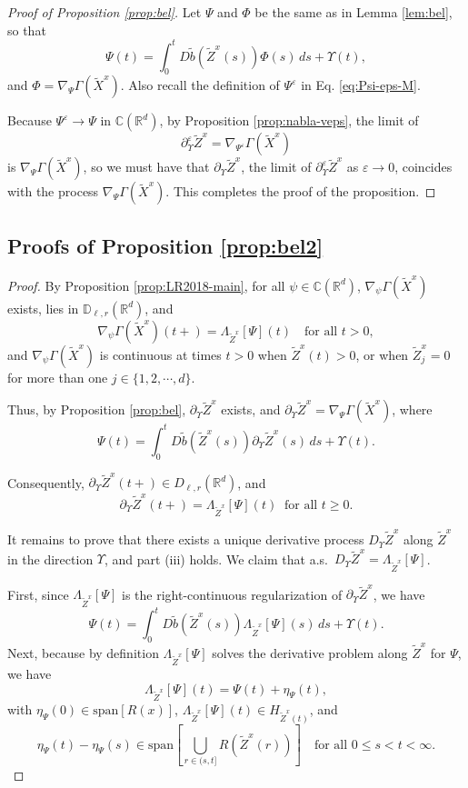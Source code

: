 \documentclass[11pt]{article}
\theoremstyle{definition}
\theoremstyle{plain}
\newcommand{\R}{\mathbb{R}}
\newcommand{\C}{\mathbb{C}}
\newcommand{\D}{\mathbb{D}}
\newcommand{\tb}{\tilde{b}}
\newcommand{\veps}{\varepsilon}
\begin{document}
\begin{appendices}
\begin{proof}[Proof of Proposition \ref{prop:bel}]
Let \( \Psi \) and \( \Phi \) be the same as in Lemma \ref{lem:bel}, so that
\[
\Psi(t) = \int_0^t D\tb(\tilde{Z}^x(s)) \Phi(s)\,ds + \Upsilon(t),
\]
and \( \Phi = \nabla_{\Psi} \Gamma(\tilde{X}^x) \). Also recall the definition of \( \Psi^\varepsilon \) in Eq. \eqref{eq:Psi-eps-M}.

Because \( \Psi^\varepsilon \to \Psi \) in \( \C(\mathbb{R}^d) \), by Proposition \ref{prop:nabla-veps}, the limit of
\[
\partial_\Upsilon^\varepsilon \tilde{Z}^x = \nabla_{\Psi^\varepsilon} \Gamma(\tilde{X}^x)
\]
is \( \nabla_{\Psi} \Gamma(\tilde{X}^x) \), so we must have that $\partial_\Upsilon \tilde{Z}^x$, the limit of $\partial_\Upsilon^\varepsilon \tilde{Z}^x$ 
as $\veps \to 0$, coincides with the process \( \nabla_{\Psi} \Gamma(\tilde{X}^x) \).
This completes the proof of the proposition. 
\end{proof}

\subsection{Proofs of Proposition \ref{prop:bel2}}
\begin{proof}
By Proposition \ref{prop:LR2018-main}, for all \( \psi \in \C(\R^d) \),  
\( \nabla_\psi \Gamma(\tilde{X}^x) \) exists, lies in \( \D_{\ell,r}(\mathbb{R}^d) \), and
\[
\nabla_\psi \Gamma(\tilde{X}^x)(t+) = \Lambda_{\tilde{Z}^x}[\Psi](t) \quad \text{for all } t > 0,
\]
and \( \nabla_\psi \Gamma(\tilde{X}^x) \) is continuous at times \( t > 0 \) when $\tilde Z^x(t) > 0$, or when $\tilde Z^x_j = 0$ for more than one $j \in \{1, 2, \cdots, d\}$.

Thus, by Proposition \ref{prop:bel}, \( \partial_\Upsilon \tilde{Z}^x \) exists, and
$\partial_\Upsilon \tilde{Z}^x = \nabla_{\Psi} \Gamma(\tilde{X}^x)$, 
where
\[
\Psi(t) = \int_0^t D\tb(\tilde{Z}^x(s)) \partial_\Upsilon \tilde{Z}^x(s)\,ds + \Upsilon(t).
\]

Consequently, \( \partial_\Upsilon \tilde{Z}^x(t+) \in D_{\ell, r}(\mathbb{R}^d) \), and
\[
\partial_\Upsilon \tilde{Z}^x(t+) = \Lambda_{\tilde{Z}^x}[\Psi](t) \ \text{ for all } t \ge 0.
\]

It remains to prove that there exists a unique derivative process \( D_\Upsilon \tilde{Z}^x \) along \( \tilde{Z}^x \) in the direction \( \Upsilon \), and part (iii) holds.
We claim that a.s.\ $D_\Upsilon \tilde{Z}^x = \Lambda_{\tilde{Z}^x}[\Psi]$.

First, since \( \Lambda_{\tilde{Z}^x}[\Psi] \) is the right-continuous regularization of \( \partial_\Upsilon \tilde{Z}^x \), we have
\[
\Psi(t) = \int_0^t D\tb(\tilde{Z}^x(s)) \Lambda_{\tilde{Z}^x}[\Psi](s)\,ds + \Upsilon(t).
\]
Next, because by definition \( \Lambda_{\tilde{Z}^x}[\Psi] \) solves the derivative problem along \( \tilde{Z}^x \) for \( \Psi \), we have
\[
\Lambda_{\tilde{Z}^x}[\Psi](t) = \Psi(t) + \eta_{\Psi}(t),
\]
with $\eta_{\Psi}(0) \in \text{span}[R(x)]$, $\Lambda_{\tilde{Z}^x}[\Psi](t) \in H_{\tilde{Z}^x(t)}$, and 
\[
\eta_{\Psi}(t) - \eta_{\Psi}(s) \in \text{span} \left[ \bigcup_{r \in (s,t]} R(\tilde{Z}^x(r)) \right]
\quad \text{for all } 0 \le s < t < \infty.
\]


\end{proof}
\end{appendices}
\end{document}
